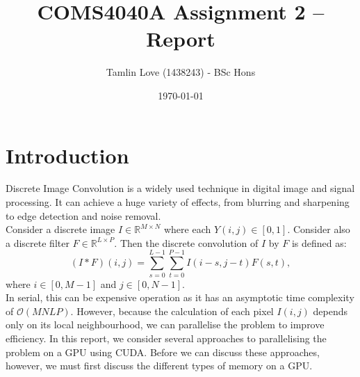 \documentclass[10pt]{article}
\begin{document}
\title{COMS4040A Assignment 2 -- Report}
\author{Tamlin Love (1438243) - BSc Hons}
\date{\today} 
\maketitle 
\pagestyle{fancy}
\fancyhf{}
\fancyhead[R]{\thepage}
{} 
\vspace{-1.5cm}
\section{Introduction}\label{Introduction}
Discrete Image Convolution is a widely used technique in digital image and signal processing. It can achieve a huge variety of effects, from blurring and sharpening to edge detection and noise removal. 
\\
Consider a discrete image $I \in \mathbb{R}^{M \times N}$ where each $Y(i,j) \in [0,1]$. Consider also a discrete filter $F \in \mathbb{R}^{L \times P}$. Then the discrete convolution of $I$ by $F$ is defined as:
\begin{equation}
(I*F)(i,j) = \sum_{s=0}^{L-1}\sum_{t=0}^{P-1} I(i-s,j-t)F(s,t),
\end{equation}
where $i\in[0,M-1]$ and $j\in[0,N-1]$.
\\
In serial, this can be expensive operation as it has an asymptotic time complexity of $\mathcal{O}(MNLP)$. However, because the calculation of each pixel $I(i,j)$ depends only on its local neighbourhood, we can parallelise the problem to improve efficiency. In this report, we consider several approaches to parallelising the problem on a GPU using CUDA. Before we can discuss these approaches, however, we must first discuss the different types of memory on a GPU.
\end{document}
